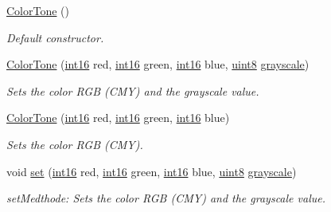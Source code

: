 \begin{DoxyCompactItemize}
\item 
\hypertarget{class_f2_c_1_1_color_tone_a68ba8b0f0a6192d71a488328f4655e33}{
\hyperlink{class_f2_c_1_1_color_tone_a68ba8b0f0a6192d71a488328f4655e33}{ColorTone} ()}
\label{class_f2_c_1_1_color_tone_a68ba8b0f0a6192d71a488328f4655e33}

\begin{DoxyCompactList}\small\item\em Default constructor. \item\end{DoxyCompactList}\item 
\hyperlink{class_f2_c_1_1_color_tone_a89d4963f269e7bfb95cd9200407e8cb7}{ColorTone} (\hyperlink{namespace_f2_c_ab83c1e14d784a7d520d770ca6fa8fd8e}{int16} red, \hyperlink{namespace_f2_c_ab83c1e14d784a7d520d770ca6fa8fd8e}{int16} green, \hyperlink{namespace_f2_c_ab83c1e14d784a7d520d770ca6fa8fd8e}{int16} blue, \hyperlink{namespace_f2_c_a711deb33697d145669b9c0c4fe87c7ca}{uint8} \hyperlink{class_f2_c_1_1_color_tone_a563a24af834bcd125e75b69d72b4352d}{grayscale})
\begin{DoxyCompactList}\small\item\em Sets the color RGB (CMY) and the grayscale value. \item\end{DoxyCompactList}\item 
\hyperlink{class_f2_c_1_1_color_tone_a8e73eb2e9c80a299ab7d1f935d33d613}{ColorTone} (\hyperlink{namespace_f2_c_ab83c1e14d784a7d520d770ca6fa8fd8e}{int16} red, \hyperlink{namespace_f2_c_ab83c1e14d784a7d520d770ca6fa8fd8e}{int16} green, \hyperlink{namespace_f2_c_ab83c1e14d784a7d520d770ca6fa8fd8e}{int16} blue)
\begin{DoxyCompactList}\small\item\em Sets the color RGB (CMY). \item\end{DoxyCompactList}\item 
void \hyperlink{class_f2_c_1_1_color_tone_afd52bb767904712a68742e770619d7e8}{set} (\hyperlink{namespace_f2_c_ab83c1e14d784a7d520d770ca6fa8fd8e}{int16} red, \hyperlink{namespace_f2_c_ab83c1e14d784a7d520d770ca6fa8fd8e}{int16} green, \hyperlink{namespace_f2_c_ab83c1e14d784a7d520d770ca6fa8fd8e}{int16} blue, \hyperlink{namespace_f2_c_a711deb33697d145669b9c0c4fe87c7ca}{uint8} \hyperlink{class_f2_c_1_1_color_tone_a563a24af834bcd125e75b69d72b4352d}{grayscale})
\begin{DoxyCompactList}\small\item\em setMedthode: Sets the color RGB (CMY) and the grayscale value. \item\end{DoxyCompactList}\item 

\end{DoxyCompactItemize}

